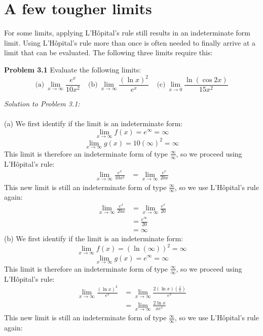 \documentclass[11pt]{scrartcl}
\begin{document}
\section{A few tougher limits}
\noindent 
For some limits, applying L'Hôpital's rule still results in an indeterminate form limit. Using L'Hôpital's rule more than once is often needed to finally arrive at a limit that can be evaluated. The following three limits require this: 
\begin{tcolorbox}
[colback=purple!5!white,colframe=purple!75!black]
\textbf{Problem 3.1} Evaluate the following limits: 
$$\text{(a)} \ \lim_{x \to \infty} \frac{e^x}{10x^2} \ \ \ \ \ \text{(b)} \ \lim_{x \to \infty} \frac{(\ln x)^2}{e^x} \ \ \ \ \ \text{(c)} \ \lim_{x \to 0} \frac{\ln(\cos 2x)}{15x^2}$$
\end{tcolorbox}
\noindent 
\textit{Solution to Problem 3.1:} \\
\\
\noindent 
(a) We first identify if the limit is an indeterminate form: 
$$\lim_{x \to \infty}f(x)=e^\infty=\infty$$
$$\lim_{x \to \infty}g(x)=10(\infty)^2=\infty$$
\noindent 
This limit is therefore an indeterminate form of type $\frac{\infty}{\infty}$, so we proceed using L'Hôpital's rule:
\begin{align*}
\lim_{x \to \infty}\frac{e^x}{10x^2} &=\lim_{x \to \infty}\frac{e^x}{20x}
\end{align*}
\noindent 
This new limit is still an indeterminate form of type $\frac{\infty}{\infty}$, so we use L'Hôpital's rule again: 
\begin{align*}
\lim_{x \to \infty}\frac{e^x}{20x} &= \lim_{x \to \infty}\frac{e^x}{20} \\
                                   &=    
\frac{e^\infty}{20} \\
                                   &=\infty
\end{align*}
\noindent 
(b) We first identify if the limit is an indeterminate form: 
$$\lim_{x \to \infty}f(x)=(\ln(\infty))^2=\infty$$
$$\lim_{x \to \infty}g(x)=e^\infty=\infty$$
\noindent 
This limit is therefore an indeterminate form of type $\frac{\infty}{\infty}$, so we proceed using L'Hôpital's rule: 
\begin{align*}
 \lim_{x \to \infty} \frac{(\ln x)^2}{e^x} &= \lim_{x \to \infty} \frac{2(\ln x)(\frac{1}{x})}{e^x} \\
                                           &= \lim_{x \to \infty} \frac{2 \ln x}{xe^x}
\end{align*}
\noindent 
This new limit is still an indeterminate form of type $\frac{\infty}{\infty}$, so we use L'Hôpital's rule again: 
\end{document}
